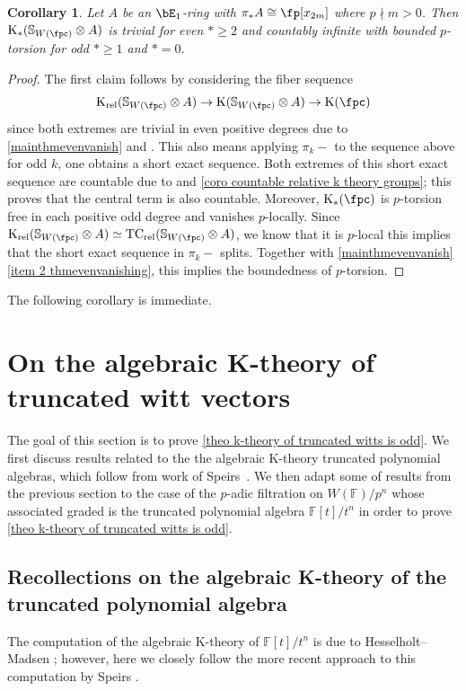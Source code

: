 \documentclass[english,10pt]{amsart}
\newcommand{\sph}{\mathbb{S}}
\newcommand{\rel}{\textup{rel}}
\newcommand{\field}{\mathbb{F}}
\newtheorem{coro}{Corollary}[section]
\theoremstyle{definition}
\numberwithin{equation}{section}
\newcommand{\pis}{\pi_*}
\begin{document}
\begin{coro}\label{coro absolute k theory is odd}
Let $A$ be an $\bE_1$-ring with $\pis A \cong \fp[x_{2m}]$ where $p \nmid m >0$. Then $\mathrm{K}_*(\sph_{W(\fpc)} \otimes A)$ is  trivial for even  $*\geq 2$ and countably infinite with bounded $p$-torsion for odd $* \geq 1$ and $*=0$.  
\end{coro}
\begin{proof}
The first claim follows by considering the fiber sequence 
\[\mathrm{K}_{\rel}(\sph_{W(\fpc)}\otimes A) \to \mathrm{K}(\sph_{W(\fpc)}\otimes A) \to  \mathrm{K}(\fpc) \]
since both extremes are trivial in even positive degrees due to \autoref{mainthmevenvanish}  and \cite[Section~12]{Qui72}. This also means applying $\pi_k-$ to the sequence above for odd $k$, one obtains a short exact sequence. Both extremes of this short exact sequence are countable due to  \cite[Section~12]{Qui72} and \autoref{coro countable relative k theory groups}; this proves that the central term is also countable.  Moreover, $\mathrm{K}_*(\fpc)$ is  $p$-torsion free in each positive odd degree and vanishes $p$-locally. 
Since $\mathrm{K}_{\rel}(\sph_{W(\fpc)}\otimes A)\simeq \mathrm{TC}_{\rel}(\sph_{W(\fpc)}\otimes A)$, we know that it is $p$-local this implies that the short exact sequence in $\pi_k-$ splits. Together with \autoref{mainthmevenvanish} \eqref{item 2 thmevenvanishing}, this implies the boundedness of $p$-torsion. 
\end{proof}

The following corollary is immediate. 

\cardoverFpbar*


\section{On the algebraic K-theory of truncated witt vectors}

The goal of this section is to prove \autoref{theo k-theory of truncated witts is odd}. We first discuss results related to the the algebraic K-theory truncated polynomial algebras,  which follow from work of Speirs~\cite{speirs2020truncatedpolynomial}. We then adapt some of results from the previous section to the case of the $p$-adic filtration on $W(\field)/p^n$ whose associated graded is the truncated polynomial algebra $\field[t]/t^n$ in order to prove \autoref{theo k-theory of truncated witts is odd}. 

\subsection{Recollections on the algebraic K-theory of the truncated polynomial algebra}
The computation of the algebraic K-theory of $\field[t]/t^n$ is due to Hesselholt--Madsen \cite{hesselholt1997kthryoftruncated}; however, here we closely follow the more recent approach to this computation by Speirs \cite{speirs2020truncatedpolynomial}.
\end{document}
